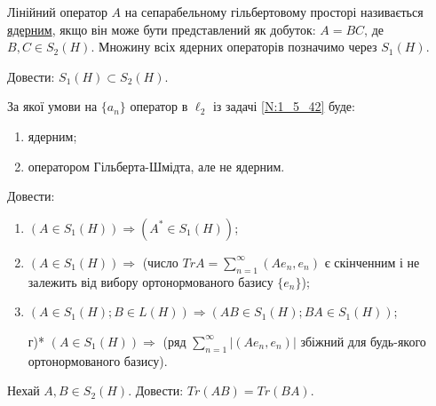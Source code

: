 \begin{theory}
    Лінійний оператор $A$ на сепарабельному гільбертовому просторі називається \underline{ядерним}, якщо він
    може бути представлений як добуток: $A = BC$, де $B, C \in S_2(H)$. Множину всіх ядерних операторів позначимо
    через $S_1(H)$.
\end{theory}

\begin{exercise}
    Довести: $S_1(H) \subset S_2(H)$.
\end{exercise}

\begin{exercise}\label{N:1_5_44}
    За якої умови на $\{a_n\}$ оператор в $\ell_2$ із задачі \ref{N:1_5_42} буде:
    \begin{enumerate}
        \item ядерним;
        \item оператором Гільберта-Шмідта, але не ядерним.
    \end{enumerate}
\end{exercise}

\begin{exercise}
    Довести:
    \begin{enumerate}
        \item $(A \in S_1(H)) \Rightarrow (A^* \in S_1(H))$;
        \item $(A \in S_1(H)) \Rightarrow$ (число $Tr A = \sum\limits_{n = 1}^\infty (A e_n, e_n)$ є скінченним
        і не залежить від вибору ортонормованого базису $\{e_n\}$);
        \item $(A \in S_1(H); B \in L(H)) \Rightarrow (AB \in S_1(H); BA \in S_1(H))$; 
        \item[г)*] $(A \in S_1(H)) \Rightarrow$ (ряд $\sum\limits_{n = 1}^\infty |(A e_n, e_n)|$ збіжний для будь-якого ортонормованого базису).
    \end{enumerate}
\end{exercise}

\begin{exercise}
    Нехай $A, B \in S_2(H)$. Довести: $Tr (AB) = Tr (BA)$.
\end{exercise}
